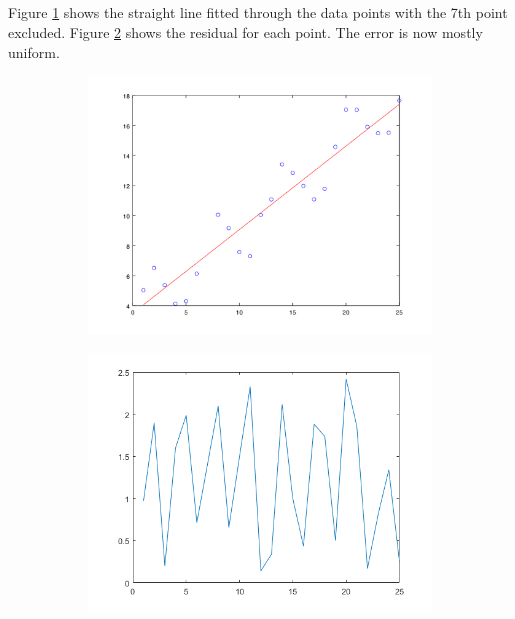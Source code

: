 \documentclass[12pt]{article}
\begin{document}
\subsection{} %

Figure \ref{fig_3b_plot} shows the straight line fitted through the data points with the 7th point excluded. Figure \ref{fig_3b_r} shows the residual for each point. The error is now mostly uniform.

\begin{figure}[t!]
    \begin{subfigure}[t]{0.5\textwidth}
        \centering
        \includegraphics[width=\linewidth]{plot_3b}
        \caption{}
        \label{fig_3b_plot}
    \end{subfigure}
    \begin{subfigure}[t]{0.5\textwidth}
        \centering
        \includegraphics[width=\linewidth]{plot_3b_r}
        \caption{}
        \label{fig_3b_r}
    \end{subfigure}
    \caption{}
    \label{fig_3b}
\end{figure}
\end{document}
